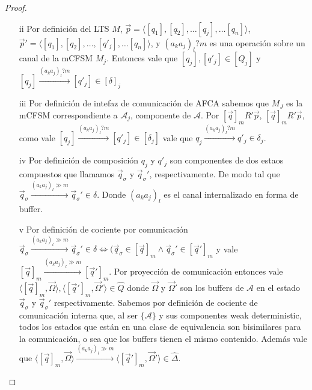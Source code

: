 \begin{proof}
\begin{itemize}
    \item[ii] Por definición del LTS $M$, $\overrightarrow{p}=\langle [q_1], [q_2], \ldots [q_j], \ldots [q_n] \rangle$, $\overrightarrow{p}'= \langle [q_1], [q_2], \ldots, [q'_j], \ldots [q_n] \rangle$, y $(a_ka_j)_l?m$ es una operación sobre un canal de la mCFSM $M_j$. Entonces vale que $[q_j],[q'_j] \in [Q_j]$ y $[q_j] \xrightarrow{(a_ka_j)_l?m} [q'_j] \in [\delta]_j$
    
    \item[iii] Por definición de intefaz de comunicación de AFCA sabemos que $M_J$ es la mCFSM correspondiente a $\mathcal{A}_j$, componente de $\mathcal{A}$. Por $[\overrightarrow{q}]_mR'\overrightarrow{p}$, $[\overrightarrow{q}]_mR'\overrightarrow{p}$, como vale $[q_j] \xrightarrow{(a_ka_j)_l?m} [q'_j] \in [\delta_j]$ vale que $q_j \xrightarrow{(a_ka_j)_l?m} q'_j \in \delta_j$. 
    
    \item[iv] Por definición de composición $q_j$ y $q'_j$ son componentes de dos estaos compuestos que llamamos $\overrightarrow{q}_{\sigma}$ y $\overrightarrow{q}_{\sigma}'$, respectivamente. De modo tal que $ \overrightarrow{q}_{\sigma} \xrightarrow{(a_ka_j)_l \gg m} \overrightarrow{q}_{\sigma}' \in \delta$. Donde $(a_ka_j)_l$ es el canal internalizado en forma de buffer.
    
    \item[v] Por definición de cociente por comunicación $\overrightarrow{q}_{\sigma} \xrightarrow{(a_ka_j)_l \gg m} \overrightarrow{q}_{\sigma}' \in \delta \iff (\overrightarrow{q}_{\sigma} \in [\overrightarrow{q}]_m \land \overrightarrow{q}_{\sigma}' \in [\overrightarrow{q}']_m$ y vale $[\overrightarrow{q}]_m \xrightarrow{(a_ka_j)_l \gg m} [\overrightarrow{q}']_m$. Por proyección de comunicación entonces vale $\langle [\overrightarrow{q}]_m, \overrightarrow{\Omega} \rangle, \langle [\overrightarrow{q}']_m, \overrightarrow{\Omega}' \rangle \in \hat{Q}$ donde $\overrightarrow{\Omega}$ y $\overrightarrow{\Omega}'$ son los buffers de $\mathcal{A}$ en el estado $\overrightarrow{q}_{\sigma}$ y $\overrightarrow{q}_{\sigma}'$ respectivamente. Sabemos por definición de cociente de comunicación interna que, al ser $\{\mathcal{A}\}$ y sus componentes weak deterministic, todos los estados que están en una clase de equivalencia son bisimilares para la comunicación, o sea que los buffers tienen el mismo contenido. Además vale que $\langle [\overrightarrow{q}]_m, \overrightarrow{\Omega} \rangle \xrightarrow{(a_ka_j)_l \gg m} \langle [\overrightarrow{q}']_m, \overrightarrow{\Omega}' \rangle \in \hat{\Delta}$.
        

\end{itemize}
\end{proof}
